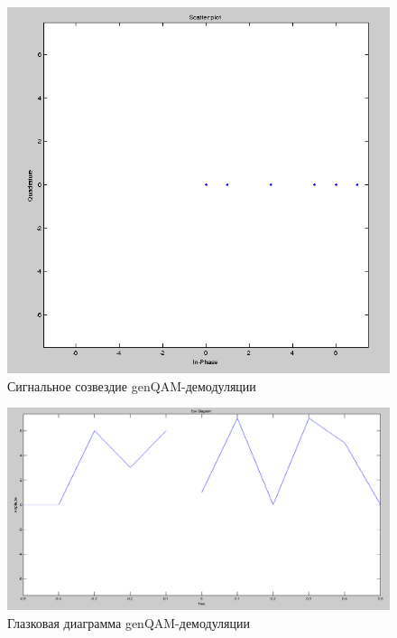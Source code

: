 \begin{figure}[H]
\includegraphics[width=150mm, scale = 0.9]{lab9/9_15}
   \caption{Сигнальное созвездие genQAM-демодуляции}
\end{figure}




\begin{figure}[H]
\includegraphics[width=150mm, scale = 0.9]{lab9/9_16}
   \caption{Глазковая диаграмма genQAM-демодуляции}
\end{figure}



